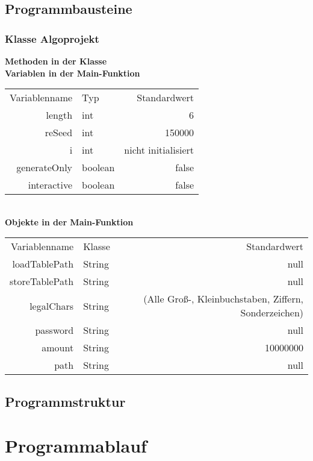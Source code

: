 \documentclass[11pt]{article}
\begin{document}
  \subsection{Programmbausteine}
  \subsubsection{Klasse Algoprojekt}
  \textbf{Methoden in der Klasse}\\
  \textbf{Variablen in der Main-Funktion}\\
  \begin{tabular}{rlr}
  Variablenname & Typ & Standardwert \\
  length & int & 6 \\
  reSeed & int & 150000 \\
  i & int & nicht initialisiert \\
  generateOnly & boolean & false \\
  interactive & boolean & false \\
  \end{tabular}\\
  \textbf{Objekte in der Main-Funktion}\\
  \begin{tabular}{rlr}
  Variablenname & Klasse & Standardwert \\
    loadTablePath & String & null \\
  storeTablePath & String & null \\
  legalChars & String & (Alle Groß-, Kleinbuchstaben, Ziffern, Sonderzeichen)\\
  password & String & null \\
  amount & String & 10000000 \\
  path & String & null \\
  \end{tabular}
  \subsection{Programmstruktur}
  \section{Programmablauf}
  
\end{document}
